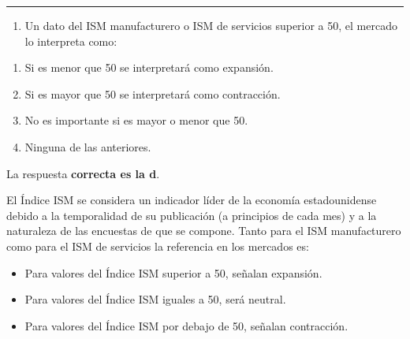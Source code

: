 \documentclass[
  letterpaper,
  DIV=11,
  numbers=noendperiod]{scrreprt}
\providecommand{\tightlist}{%
  \setlength{\itemsep}{0pt}\setlength{\parskip}{0pt}}\usepackage{longtable,booktabs,array}
\begin{document}
\begin{center}\rule{0.5\linewidth}{0.5pt}\end{center}

\begin{enumerate}
\def\labelenumi{\arabic{enumi}.}
\setcounter{enumi}{29}
\tightlist
\item
  Un dato del ISM manufacturero o ISM de servicios superior a 50, el
  mercado lo interpreta como:
\end{enumerate}

\begin{enumerate}
\def\labelenumi{\alph{enumi})}
\item
  Si es menor que 50 se interpretará como expansión.
\item
  Si es mayor que 50 se interpretará como contracción.
\item
  No es importante si es mayor o menor que 50.
\item
  Ninguna de las anteriores.
\end{enumerate}

\begin{tcolorbox}[enhanced jigsaw, left=2mm, opacityback=0, colback=white, breakable, arc=.35mm, bottomrule=.15mm, rightrule=.15mm, toprule=.15mm, leftrule=.75mm, colframe=quarto-callout-tip-color-frame]
\begin{minipage}[t]{5.5mm}
\textcolor{quarto-callout-tip-color}{\faLightbulb}
\end{minipage}%
\begin{minipage}[t]{\textwidth - 5.5mm}

La respuesta \textbf{correcta es la d}.

El Índice ISM se considera un indicador líder de la economía
estadounidense debido a la temporalidad de su publicación (a principios
de cada mes) y a la naturaleza de las encuestas de que se compone. Tanto
para el ISM manufacturero como para el ISM de servicios la referencia en
los mercados es:

\begin{itemize}
\item
  Para valores del Índice ISM superior a 50, señalan expansión.
\item
  Para valores del Índice ISM iguales a 50, será neutral.
\item
  Para valores del Índice ISM por debajo de 50, señalan contracción.
\end{itemize}

\end{minipage}%
\end{tcolorbox}
\end{document}
